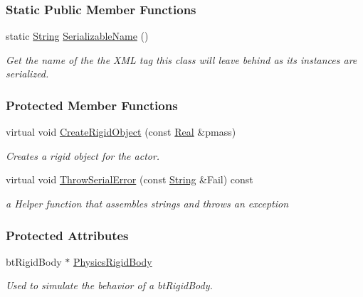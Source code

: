 \subsubsection*{Static Public Member Functions}
\begin{DoxyCompactItemize}
\item 
static \hyperlink{namespaceMezzanine_acf9fcc130e6ebf08e3d8491aebcf1c86}{String} \hyperlink{classMezzanine_1_1ActorRigid_a9f4272bae46df5bd1dfed8753cd19dc6}{Serializable\-Name} ()
\begin{DoxyCompactList}\small\item\em Get the name of the the X\-M\-L tag this class will leave behind as its instances are serialized. \end{DoxyCompactList}\end{DoxyCompactItemize}
\subsubsection*{Protected Member Functions}
\begin{DoxyCompactItemize}
\item 
virtual void \hyperlink{classMezzanine_1_1ActorRigid_a44a1c393e69456fb7fa79affe1684153}{Create\-Rigid\-Object} (const \hyperlink{namespaceMezzanine_a726731b1a7df72bf3583e4a97282c6f6}{Real} \&pmass)
\begin{DoxyCompactList}\small\item\em Creates a rigid object for the actor. \end{DoxyCompactList}\item 
virtual void \hyperlink{classMezzanine_1_1ActorRigid_ad640944179df98fbaf5ecf5e2ed5ba2c}{Throw\-Serial\-Error} (const \hyperlink{namespaceMezzanine_acf9fcc130e6ebf08e3d8491aebcf1c86}{String} \&Fail) const 
\begin{DoxyCompactList}\small\item\em a Helper function that assembles strings and throws an exception \end{DoxyCompactList}\end{DoxyCompactItemize}
\subsubsection*{Protected Attributes}
\begin{DoxyCompactItemize}
\item 
\hypertarget{classMezzanine_1_1ActorRigid_a92b4e040b752527b73e861ab7c00119e}{bt\-Rigid\-Body $\ast$ \hyperlink{classMezzanine_1_1ActorRigid_a92b4e040b752527b73e861ab7c00119e}{Physics\-Rigid\-Body}}\label{classMezzanine_1_1ActorRigid_a92b4e040b752527b73e861ab7c00119e}

\begin{DoxyCompactList}\small\item\em Used to simulate the behavior of a bt\-Rigid\-Body. \end{DoxyCompactList}\end{DoxyCompactItemize}
